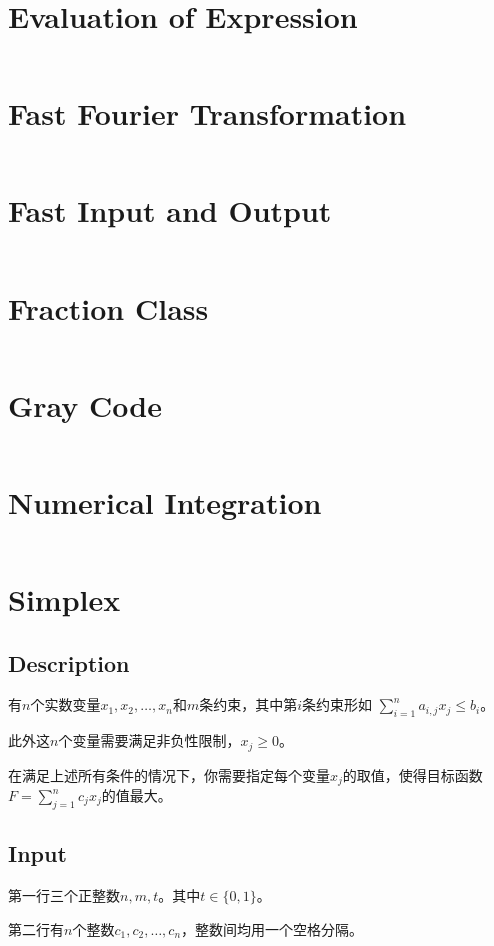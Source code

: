\documentclass[a4paper,openany]{book}
\newcommand{\cppcode}[1]
{
  \inputminted[mathescape,
  tabsize=4,
  linenos,
  framesep=2mm,
  breakaftergroup=true,
  breakautoindent=true,
  breakbytoken=true,
  breaklines=true,
  fontsize=\small
  ]{cpp}{Source/#1}
}
\begin{document}
\section{Evaluation of Expression}
\cppcode{/Numerical Algorithms/Evaluation of Expression.cpp}
\section{Fast Fourier Transformation}
\cppcode{/Numerical Algorithms/Fast Fourier Transformation.cpp}
\section{Fast Input and Output}
\cppcode{/Numerical Algorithms/Fast Input and Output.cpp}
\section{Fraction Class}
\cppcode{/Numerical Algorithms/Fraction Class.cpp}
\section{Gray Code}
\cppcode{/Numerical Algorithms/Gray Code.cpp}
\section{Numerical Integration}
\cppcode{/Numerical Algorithms/Numerical Integration.cpp}
\section{Simplex}
\subsection{Description}
有$n$个实数变量$x_1,x_2,\ldots,x_n$和$m$条约束，其中第$i$条约束形如 $\sum_{i = 1}^{n}a_{i,j}x_j \leq b_i$。

此外这$n$个变量需要满足非负性限制，$x_j \geq 0$。

在满足上述所有条件的情况下，你需要指定每个变量$x_j$的取值，使得目标函数$F = \sum_{j = 1}^{n}c_jx_j$的值最大。

\subsection{Input}
第一行三个正整数$n,m,t$。其中$t \in \{ 0,1 \}$。

第二行有$n$个整数$c_1,c_2,\ldots,c_n$，整数间均用一个空格分隔。
\end{document}
